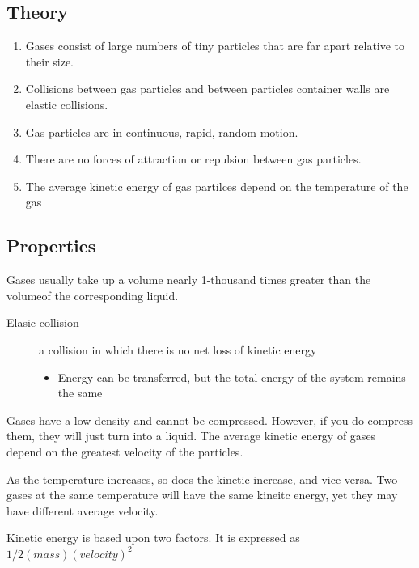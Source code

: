 \subsection{Theory}
\begin{enumerate}
  \item Gases consist of large numbers of tiny particles that are far apart
    relative to their size.
  \item Collisions between gas particles and between particles container walls
    are elastic collisions.
  \item Gas particles are in continuous, rapid, random motion.
  \item There are no forces of attraction or repulsion between gas particles.
  \item The average kinetic energy of gas partilces depend on the temperature of
    the gas
\end{enumerate}

\subsection{Properties}
Gases usually take up a volume nearly 1-thousand times greater than the volumeof
the corresponding liquid.

\begin{description}
  \item[Elasic collision] a collision in which there is no net loss of kinetic
    energy
    \begin{itemize}
      \item Energy can be transferred, but the total energy of the system
        remains the same
    \end{itemize}
\end{description}

Gases have a low density and cannot be compressed.  However, if you do compress
them, they will just turn into a liquid.  The average kinetic energy of gases
depend on the greatest velocity of the particles.

As the temperature increases, so does the kinetic increase, and vice-versa.  Two
gases at the same temperature will have the same kineitc energy, yet they may
have different average velocity.

Kinetic energy is based upon two factors.  It is expressed as
$1/2(mass)(velocity)^2$

